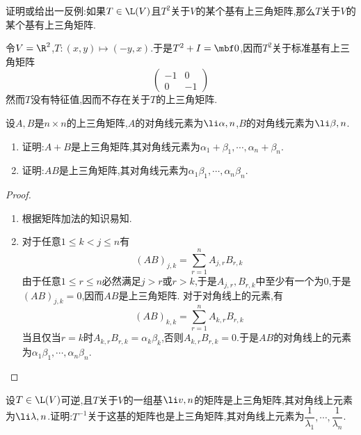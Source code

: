 \documentclass{ctexart}
\begin{document}
\pagestyle{empty}
\begin{center}
    \large{}
\end{center}
\begin{problem}[1.]
    证明或给出一反例:如果$T\in\L(V)$且$T^2$关于$V$的某个基有上三角矩阵,那么$T$关于$V$的某个基有上三角矩阵.
\end{problem}
\begin{solution}
    令$V=\R^2$,$T:(x,y)\mapsto(-y,x)$.于是$T^2+I=\mbf0$,因而$T^2$关于标准基有上三角矩阵
    \[\begin{pmatrix}
        -1&0\\0&-1
    \end{pmatrix}\]
    然而$T$没有特征值,因而不存在关于$T$的上三角矩阵.
\end{solution}
\begin{problem}[2.]
    设$A,B$是$n\times n$的上三角矩阵,$A$的对角线元素为$\li\alpha,n$,$B$的对角线元素为$\li\beta,n$.
    \begin{enumerate}[label=\tbf{(\arabic*)}]
        \item 证明:$A+B$是上三角矩阵,其对角线元素为$\alpha_1+\beta_1,\cdots,\alpha_n+\beta_n$.
        \item 证明:$AB$是上三角矩阵,其对角线元素为$\alpha_1\beta_1,\cdots,\alpha_n\beta_n$.
    \end{enumerate}
\end{problem}
\begin{proof}
    \begin{enumerate}[label=\tbf{(\arabic*)}]
        \item 根据矩阵加法的知识易知.
        \item 对于任意$1\leqslant k<j\leqslant n$有
            \[(AB)_{j,k}=\sum_{r=1}^{n}A_{j,r}B_{r,k}\]
            由于任意$1\leqslant r\leqslant n$必然满足$j>r$或$r>k$,于是$A_{j,r},B_{r,k}$中至少有一个为$0$,于是$(AB)_{j,k}=0$,因而$AB$是上三角矩阵.%
            对于对角线上的元素,有
            \[(AB)_{k,k}=\sum_{r=1}^nA_{k,r}B_{r,k}\]
            当且仅当$r=k$时$A_{k,r}B_{r,k}=\alpha_k\beta_k$,否则$A_{k,r}B_{r,k}=0$.于是$AB$的对角线上的元素为$\alpha_1\beta_1,\cdots,\alpha_n\beta_n$.
    \end{enumerate}
\end{proof}
\begin{problem}[3.]
    设$T\in\L(V)$可逆,且$T$关于$V$的一组基$\li v,n$的矩阵是上三角矩阵,其对角线上元素为$\li\lambda,n$.证明:$T^{-1}$关于这基的矩阵也是上三角矩阵,其对角线上元素为$\dfrac{1}{\lambda_1},\cdots,\dfrac1{\lambda_n}$.
\end{problem}
\end{document}
